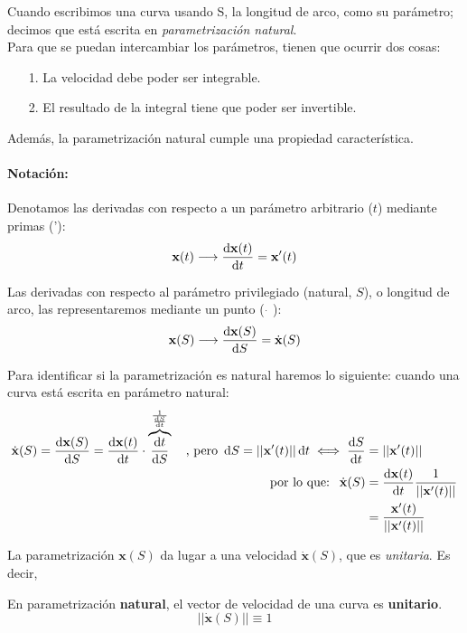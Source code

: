 Cuando escribimos una curva usando S, la longitud de arco, como su parámetro; decimos que está escrita en \emph{parametrización natural}.\\

Para que se puedan intercambiar los parámetros, tienen que ocurrir dos cosas:
\begin{enumerate}
    \item[1. ] La velocidad debe poder ser integrable.
    \item[2. ] El resultado de la integral tiene que poder ser invertible.
\end{enumerate}

Además, la parametrización natural cumple una propiedad característica.\\

\paragraph{Notación:} Denotamos las derivadas con respecto a un parámetro arbitrario ($t$) mediante primas ('):
$$
\mathbf{x}(t)\longrightarrow \dv{\mathbf{x}(t)}{t}=\mathbf{x'}(t)
$$

Las derivadas con respecto al parámetro privilegiado (natural, $S$), o longitud de arco, las representaremos mediante un punto ( $\dot{}$ ):
$$
\mathbf{x}(S)\longrightarrow \dv{\mathbf{x}(S)}{S}=\dot{\mathbf{x}}(S)
$$

Para identificar si la parametrización es natural haremos lo siguiente: cuando una curva está escrita en parámetro natural:
\begin{equation*}
    \begin{split}
        \dot{\mathbf{x}}(S)=\dv{\mathbf{x}(S)}{S}=\dv{\mathbf{x}(t)}{t} \cdot \overbrace{\dv{t}{S}}^{\frac{1}{\dv{S}{t}}} \quad \text{, pero} \ \odif{S}=||\mathbf{x'}(t)||\odif{t} \iff \dv{S}{t}&=||\mathbf{x'}(t)||\\
      \text{por lo que: }\  \dot{\mathbf{x}}(S) &=\dv{\mathbf{x}(t)}{t} \frac{1}{||\mathbf{x'}(t)||}\\
        &=\frac{\mathbf{x'}(t)}{||\mathbf{x'}(t)||}
    \end{split}
\end{equation*}

La parametrización $\mathbf{x}(S)$ da lugar a una velocidad $\dot{\mathbf{x}}(S)$, que es \emph{unitaria}. Es decir,
\begin{mybox}
    En parametrización \textbf{natural}, el vector de velocidad de una curva es \textbf{unitario}.
    $$
    ||\dot{\mathbf{x}}(S)||\equiv 1
    $$
\end{mybox}

